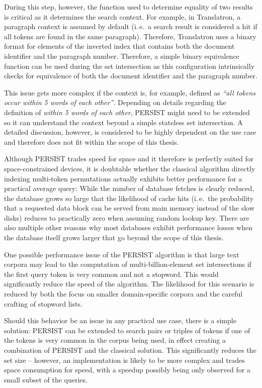 \documentclass[a4paper, 12pt, twoside, reqn]{report}
\numberwithin{figure}{chapter}
\newtheorem[L]{boxedDefinition}{Definition}
\newtheorem[L]{boxedExample}{Example}
\newcommand{\ie}{i.\,e.\ }
\newcommand{\itquote}[1]{\textit{{``}#1{''}}}
\begin{document}
During this step, however, the function used to determine equality of two results is critical as it determines the search context. For example, in Translatron, a paragraph context is assumed by default (\ie a search result is considered a hit if all tokens are found in the same paragraph). Therefore, Translatron uses a binary format for elements of the inverted index that contains both the document identifier and the paragraph number. Therefore, a simple binary equivalence function can be used during the set intersection as this configuration intrinsically checks for equivalence of both the document identifier and the paragraph number.

This issue gets more complex if the context is, for example, defined as \itquote{all tokens occur within 5 words of each other}. Depending on details regarding the definition of \textit{within 5 words of each other}, PERSIST might need to be extended so it can understand the context beyond a simple stateless set intersection. A detailed discussion, however, is considered to be highly dependent on the use case and therefore does not fit within the scope of this thesis.

Although PERSIST trades speed for space and it therefore is perfectly suited for space-constrained devices, it is doubtable whether the classical algorithm directly indexing multi-token permutations actually exhibits better performance for a practical average query: While the number of database fetches is clearly reduced, the database grows so large that the likelihood of cache hits (\ie the probability that a requested data block can be served from main memory instead of the slow disks) reduces to practically zero when assuming random lookup key. There are also multiple other reasons why most databases exhibit performance losses when the database itself grows larger that go beyond the scope of this thesis.

One possible performance issue of the PERSIST algorithm is that large text corpora may lead to the computation of multi-billion-element set intersections if the first query token is very common and not a stopword. This would significantly reduce the speed of the algorithm. The likelihood for this scenario is reduced by both the focus on smaller domain-specific corpora and the careful crafting of stopword lists.

Should this behavior be an issue in any practical use case, there is a simple solution: PERSIST can be extended to search pairs or triples of tokens if one of the tokens is very common in the corpus being used, in effect creating a combination of PERSIST and the classical solution. This significantly reduces the set size -- however, an implementation is likely to be more complex and trades space consumption for speed, with a speedup possibly being only observed for a small subset of the queries.
\end{document}
